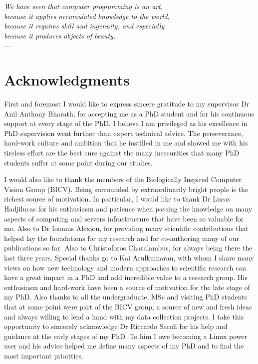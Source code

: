 
\begin{flushright}{\slshape    
    We have seen that computer programming is an art, \\ 
    because it applies accumulated knowledge to the world, \\ 
    because it requires skill and ingenuity, and especially \\
    because it produces objects of beauty.} \\ \medskip
    ---  \citep{knuth:1974}
\end{flushright}



\bigskip

\begingroup
\let\clearpage\relax
\let\cleardoublepage\relax
\let\cleardoublepage\relax
\chapter*{Acknowledgments}

First and foremost I would like to express sincere gratitude to my supervisor Dr Anil Anthony Bharath, for accepting me as a PhD student and for his continuous support at every stage of the PhD. I believe I am privileged as his excellence in PhD supervision went further than expert technical advice. The perseverance, hard-work culture and ambition that he instilled in me and showed me with his tireless effort are the best cure against the many insecurities that many PhD students suffer at some point during our studies.

I would also like to thank the members of the Biologically Inspired Computer Vision Group (BICV). Being surrounded by extraordinarily bright people is the richest source of motivation. In particular, I would like to thank Dr Lucas Hadjilucas for his enthusiasm and patience when passing the knowledge on many aspects of computing and servers infrastructure that have been so valuable for me. Also to Dr Ioannis Alexiou, for providing many scientific contributions that helped lay the foundations for my research and for co-authoring many of our publications so far. Also to Christoforos Charalambus, for always being there the last three years. Special thanks go to Kai Arulkumaran, with whom I share many views on how new technology and modern approaches to scientific research can have a great impact in a PhD and add incredible value to a research group. His enthusiasm  and hard-work have been a source of motivation for the late stage of my PhD. Also thanks to all the undergraduate, MSc and visiting PhD students that at some point were part of the BICV group, a source of new and fresh ideas and always willing to lend a hand with my data collection projects. I take this opportunity to sincerely acknowledge Dr Riccardo Secoli for his help and guidance at the early stages of my PhD. To him I owe becoming a Linux power user and his advice helped me define many aspects of my PhD and to find the most important priorities.

